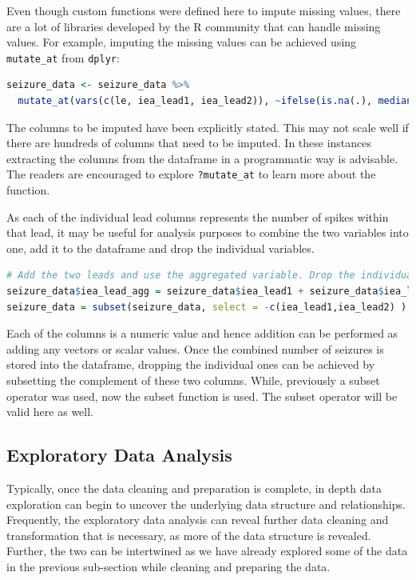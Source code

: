 Even though custom functions were defined here to impute missing values, there are a lot of libraries developed by the R community that can handle missing values. For example, imputing the missing values can be achieved using \verb|mutate_at| from \verb|dplyr|:
\begin{lstlisting}[language=R]
seizure_data <- seizure_data %>%
  mutate_at(vars(c(le, iea_lead1, iea_lead2)), ~ifelse(is.na(.), median(., na.rm = TRUE), .))
\end{lstlisting}
The columns to be imputed have been explicitly stated. This may not scale well if there are hundreds of columns that need to be imputed. In these instances extracting the columns from the dataframe in a programmatic way is advisable. The readers are encouraged to explore \verb|?mutate_at| to learn more about the function.

As each of the individual lead columns represents the number of spikes within that lead, it may be useful for analysis purposes to combine the two variables into one, add it to the dataframe and drop the individual variables.
\begin{lstlisting}[language=R]
# Add the two leads and use the aggregated variable. Drop the individual ones
seizure_data$iea_lead_agg = seizure_data$iea_lead1 + seizure_data$iea_lead2
seizure_data = subset(seizure_data, select = -c(iea_lead1,iea_lead2) )
\end{lstlisting}
Each of the columns is a numeric value and hence addition can be performed as adding any vectors or scalar values. Once the combined number of seizures is stored into the dataframe, dropping the individual ones can be achieved by subsetting the complement of these two columns. While, previously a subset operator was used, now the subset function is used. The subset operator will be valid here as well.

\subsection{Exploratory Data Analysis}
Typically, once the data cleaning and preparation is complete, in depth data exploration can begin to uncover the underlying data structure and relationships. Frequently, the exploratory data analysis can reveal further data cleaning and transformation that is necessary, as more of the data structure is revealed. Further, the two can be intertwined as we have already explored some of the data in the previous sub-section while cleaning and preparing the data.


